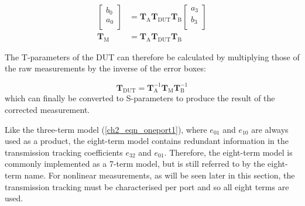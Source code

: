 \documentclass[../thesis/thesis.tex]{subfiles}
\begin{document}
\begin{refsection}

\begin{align}
	\begin{bmatrix}
		b_0 \\
		a_0 \\
	\end{bmatrix}
	&=\mathbf{T}_\textrm{A} \mathbf{T}_\textrm{DUT} \mathbf{T}_\textrm{B}
	\begin{bmatrix}
		a_3 \\
		b_3 \\
	\end{bmatrix} \\
	\mathbf{T}_\textrm{M} &= \mathbf{T}_\textrm{A}\mathbf{T}_\textrm{DUT}\mathbf{T}_\textrm{B}
\end{align}

The T-parameters of the DUT can therefore be calculated by multiplying those of the raw measurements by the inverse of the error boxes:

\begin{equation}
	\mathbf{T}_\textrm{DUT} = \mathbf{T}_\textrm{A}^{-1}\mathbf{T}_\textrm{M}\mathbf{T}_\textrm{B}^{-1}
\end{equation}
which can finally be converted to S-parameters to produce the result of the corrected measurement.

Like the three-term model (\ref{ch2_eqn_oneport1}), where $e_{01}$ and $e_{10}$ are always used as a product, the eight-term model contains redundant information in the transmission tracking coefficients $e_{32}$ and $e_{01}$. Therefore, the eight-term model is commonly implemented as a 7-term model, but is still referred to by the eight-term name. For nonlinear measurements, as will be seen later in this section, the transmission tracking must be characterised per port and so all eight terms are used.


\end{refsection}
\end{document}
